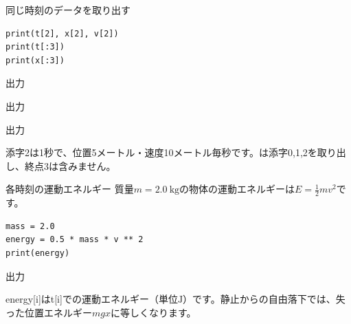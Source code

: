 \documentclass[12pt,aspectratio=43]{beamer}
\newcommand{\code}[1]{{\codefont #1}}
\newcommand{\result}[1]{%
  \par\vspace{1mm}%
  {\small\textcolor{black!60}{出力}}\quad
  {\codefont\fontsize{16}{18}\selectfont #1}\par}
\begin{document}
\begin{frame}[t,fragile]{同じ時刻のデータを取り出す}
  \setlength{\parskip}{0pt}
\begin{lstlisting}
print(t[2], x[2], v[2])
print(t[:3])
print(x[:3])
\end{lstlisting}
  \result{1.0}
  \result{[0. 0.5 1.]}
  \result{[0. 1.25 5.]}
  \small 添字2は1秒で、位置5メートル・速度10メートル毎秒です。\code{[:3]}は添字0,1,2を取り出し、終点3は含みません。
\end{frame}

\begin{frame}[t,fragile]{各時刻の運動エネルギー}
  \setlength{\parskip}{0pt}
  質量\(m=2.0\ \mathrm{kg}\)の物体の運動エネルギーは\(E=\frac{1}{2}mv^2\)です。
\begin{lstlisting}
mass = 2.0
energy = 0.5 * mass * v ** 2
print(energy)
\end{lstlisting}
  {\small\textcolor{black!60}{出力}}\quad
  {\codefont\fontsize{12}{14}\selectfont [0. 25. 100. 225. 400. 625. 900.]\par}
  \small \code{energy[i]}は\code{t[i]}での運動エネルギー（単位\(\mathrm{J}\)）です。静止からの自由落下では、失った位置エネルギー\(mgx\)に等しくなります。
\end{frame}
\end{document}
